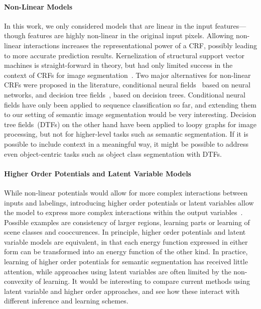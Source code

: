 \documentclass[12pt,toc=bibnumbered, a4paper,twoside,DIV=11,BCOR=1cm]{scrbook}
\begin{document}
\paragraph{Non-Linear Models}
In this work, we only considered models that are linear in the input features---though
features are highly non-linear in the original input pixels. Allowing non-linear
interactions increases the representational power of a CRF, possibly leading
to more accurate prediction results.
Kernelization of structural support vector machines is straight-forward in theory, but
had only limited success in the context of CRFs for image
segmentation~\citep{lucchi2012structured}.
Two major alternatives for non-linear CRFs were proposed in the literature,
conditional neural fields~\citep{peng2009conditional} based on neural networks,
and decision tree fields~\citep{nowozin2011decision}, based on decision trees.
Conditional neural fields have only been applied to sequence classification so far,
and extending them to our setting of semantic image segmentation would be very
interesting. Decision tree fields~(DTFs) on the other hand have been applied to loopy
graphs for image processing, but not for higher-level tasks such as semantic
segmentation. If it is possible to include context in a meaningful way, it
might be possible to address even object-centric tasks such as object class
segmentation with DTFs.

\paragraph{Higher Order Potentials and Latent Variable Models}
While non-linear potentials would allow for more complex interactions between
inputs and labelings, introducing higher order potentials or latent variables
allow the model to express more complex interactions within the output
variables~\citep{dann2012pottics, kohli2009robust}. Possible examples are
consistency of larger regions, learning parts or learning of scene classes and
cooccurences.
In principle, higher order potentials and latent variable models are
equivalent, in that each energy function expressed in either form can be
transformed into an energy function of the other kind. In practice, learning of
higher order potentials for semantic segmentation has received little
attention, while approaches using latent variables are often limited by
the non-convexity of learning.  It would be interesting to compare current
methods using latent variable and higher order approaches, and see how these
interact with different inference and learning schemes.
\end{document}
